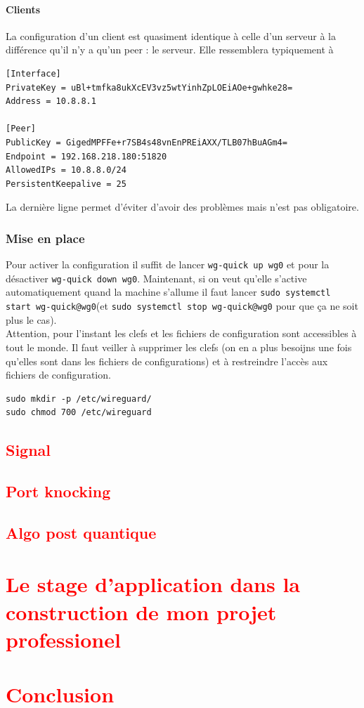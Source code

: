 \documentclass[a4paper, 12pt]{article}
\begin{document}
\paragraph{Clients}
La configuration d'un client est quasiment identique à celle d'un serveur à la différence qu'il n'y a qu'un peer : le serveur. Elle ressemblera typiquement à 
\begin{verbatim}
[Interface]
PrivateKey = uBl+tmfka8ukXcEV3vz5wtYinhZpLOEiAOe+gwhke28=
Address = 10.8.8.1

[Peer]
PublicKey = GigedMPFFe+r7SB4s48vnEnPREiAXX/TLB07hBuAGm4= 
Endpoint = 192.168.218.180:51820
AllowedIPs = 10.8.8.0/24
PersistentKeepalive = 25
\end{verbatim}
La dernière ligne permet d'éviter d'avoir des problèmes mais n'est pas obligatoire.
\subsubsection{Mise en place}
Pour activer la configuration il suffit de lancer \verb+wg-quick up wg0+ et pour la désactiver \verb+wg-quick down wg0+. Maintenant, si on veut qu'elle s'active automatiquement quand la machine s'allume il faut lancer \verb+sudo systemctl start wg-quick@wg0+(et \verb+sudo systemctl stop wg-quick@wg0+ pour que ça ne soit plus le cas). \\

Attention, pour l'instant les clefs et les fichiers de configuration sont accessibles à tout le monde. Il faut veiller à supprimer les clefs (on en a plus besoijns une fois qu'elles sont dans les fichiers de configurations) et à restreindre l'accès aux fichiers de configuration. 
\begin{verbatim}
sudo mkdir -p /etc/wireguard/
sudo chmod 700 /etc/wireguard
\end{verbatim}

\subsection{\textcolor{red}{Signal}}
\subsection{\textcolor{red}{Port knocking}}
\subsection{\textcolor{red}{Algo post quantique}}



\section{\textcolor{red}{Le stage d'application dans la construction de mon projet professionel}}
\section{\textcolor{red}{Conclusion}}


\printbibliography
\end{document}
